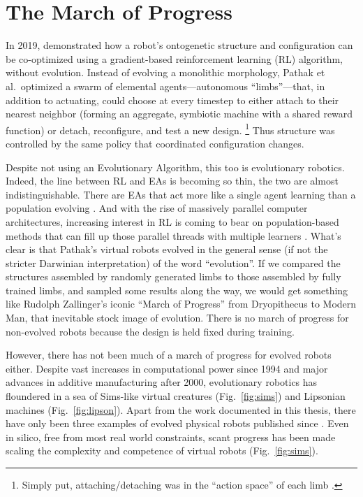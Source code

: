\section{The March of Progress}


In 2019, \citet{pathak2019learning} demonstrated how a robot's 
ontogenetic structure and configuration
can be co-optimized using a gradient-based reinforcement learning (RL) algorithm, without evolution.
Instead of evolving a monolithic morphology, Pathak et al.~optimized a swarm of elemental agents---autonomous ``limbs''---that, in addition to actuating, could choose at every timestep to either attach to their nearest neighbor (forming an aggregate, symbiotic machine with a shared reward function) or detach, reconfigure, and test a new design.%
\footnote{%
Simply put,
attaching/detaching was in the ``action space'' of each limb \cite{sutton2018reinforcement}.
}
Thus structure was controlled by the same policy that coordinated 
configuration changes.


Despite not using an Evolutionary Algorithm, this too is evolutionary robotics.
Indeed, the line between RL and EAs 
is becoming so thin, the two are almost indistinguishable.
There are EAs that act more like a single agent learning than a population evolving \cite{salimans2017evolution}.
And with the rise of massively parallel computer architectures,
increasing interest in RL is coming to bear on population-based methods that can fill up those parallel threads with multiple learners  \cite{jaderberg2019human}.
What's clear is that Pathak's virtual robots evolved in the general sense (if not the stricter Darwinian interpretation) of the word ``evolution''.
If we compared the structures assembled by randomly generated limbs to those assembled by fully trained limbs, and sampled some results along the way, we would get something like Rudolph Zallinger's iconic ``March of Progress'' from Dryopithecus to Modern Man, that inevitable stock image of evolution.
There is no march of progress for non-evolved robots because the design is held fixed during training.



However, there has not been much of a march of progress for evolved robots either.
Despite vast increases in computational power since 1994
and major advances in additive manufacturing after 2000,
evolutionary robotics has floundered in a sea of Sims-like virtual creatures (Fig.~\ref{fig:sims}) and Lipsonian machines (Fig.~\ref{fig:lipson}).
Apart from the work documented in this thesis,
there have only been three examples  \cite{hiller2012automatic,brodbeck2015morphological,cellucci20171d} of evolved physical
robots published since \citet{lipson2000automatic}.
Even in silico,
free from most real world constraints,
scant progress has been made scaling the complexity and competence
of virtual robots \cite{cheney2016difficulty} (Fig.~\ref{fig:sims}).


